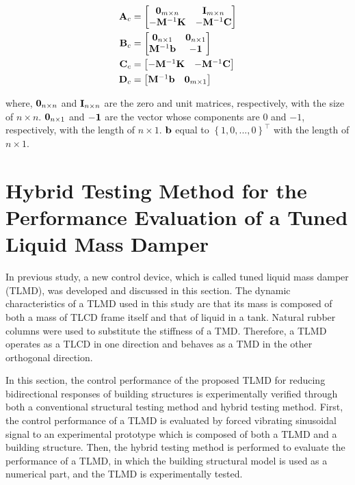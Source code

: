 \begin{align}
\mathbf{A}_{c}&=\begin{bmatrix} \mathbf{0}_{m\times n}&\mathbf{I}_{m \times n}\\-\mathbf{M}^{-1}\mathbf{K}&-\mathbf{M}^{-1}\mathbf{C}\end{bmatrix} \label{eq:4-4}\\
\mathbf{B}_{c}&=\begin{bmatrix} \mathbf{0}_{n\times 1}&\mathbf{0}_{n\times 1}\\ \mathbf{M}^{-1}\mathbf{b}&\mathbf{-1}\end{bmatrix} \label{eq:4-5}\\
\mathbf{C}_{c}&=\begin{bmatrix} -\mathbf{M}^{-1}\mathbf{K}&-\mathbf{M}^{-1}\mathbf{C}\end{bmatrix} \label{eq:4-6}\\
\mathbf{D}_{c}&=\begin{bmatrix} \mathbf{M}^{-1}\mathbf{b}&\mathbf{0}_{m \times 1}\end{bmatrix} \label{eq:4-7}
\end{align}

where, $\mathbf{0}_{n \times n}$ and $\mathbf{I}_{n \times n}$ are the zero and unit matrices, respectively, with the size of $n\times n$. $\mathbf{0}_{n\times 1}$ and $\mathbf{-1}$ are the vector whose components are $0$ and $-1$, respectively, with the length of $n \times 1$. $\mathbf{b}$ equal to $\left\{1,0,...,0\right\}^{\top}$ with the length of $n \times 1$.


\section{Hybrid Testing Method for the Performance Evaluation of a Tuned Liquid Mass Damper}
\label{chap:5}

In previous study\citep{heo2009performance}, a new control device, which is called tuned liquid mass damper (TLMD), was developed and discussed in this section. The dynamic characteristics of a TLMD used in this study are that its mass is composed of both a mass of TLCD frame itself and that of liquid in a tank. Natural rubber columns were used to substitute the stiffness of a TMD. Therefore, a TLMD operates as a TLCD in one direction and behaves as a TMD in the other orthogonal direction. 

In this section, the control performance of the proposed TLMD for reducing bidirectional responses of building structures is experimentally verified through both a conventional structural testing method and hybrid testing method. First, the control performance of a TLMD is evaluated by forced vibrating sinusoidal signal to an experimental prototype which is composed of both a TLMD and a  building structure. Then, the hybrid testing method is performed to evaluate the performance of a TLMD, in which the building structural model is used as a numerical part, and the TLMD is experimentally tested.

